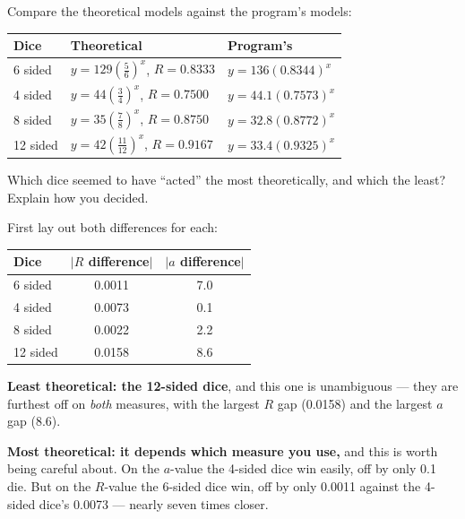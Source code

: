 \documentclass[12pt]{ximera}
\begin{document}
\begin{problem}
Compare the theoretical models against the program's models:

\begin{center}
\begin{tabular}{lll}
\hline
Dice & Theoretical & Program's \\
\hline
6 sided  & $y = 129\left(\tfrac{5}{6}\right)^x$, \; $R = 0.8333$   & $y = 136(0.8344)^x$ \\
4 sided  & $y = 44\left(\tfrac{3}{4}\right)^x$, \; $R = 0.7500$    & $y = 44.1(0.7573)^x$ \\
8 sided  & $y = 35\left(\tfrac{7}{8}\right)^x$, \; $R = 0.8750$    & $y = 32.8(0.8772)^x$ \\
12 sided & $y = 42\left(\tfrac{11}{12}\right)^x$, \; $R = 0.9167$  & $y = 33.4(0.9325)^x$ \\
\hline
\end{tabular}
\end{center}

Which dice seemed to have ``acted'' the most theoretically, and which the least? Explain
how you decided.

\begin{freeResponse}
\end{freeResponse}

\begin{solution}
First lay out both differences for each:

\begin{center}
\begin{tabular}{lcc}
\hline
Dice & $|R$ difference$|$ & $|a$ difference$|$ \\
\hline
6 sided  & 0.0011 & 7.0 \\
4 sided  & 0.0073 & 0.1 \\
8 sided  & 0.0022 & 2.2 \\
12 sided & 0.0158 & 8.6 \\
\hline
\end{tabular}
\end{center}

\textbf{Least theoretical: the 12-sided dice}, and this one is unambiguous --- they are
furthest off on \emph{both} measures, with the largest $R$ gap (0.0158) and the largest
$a$ gap (8.6).

\textbf{Most theoretical: it depends which measure you use,} and this is worth being
careful about. On the $a$-value the 4-sided dice win easily, off by only 0.1 die. But on
the $R$-value the 6-sided dice win, off by only 0.0011 against the 4-sided dice's 0.0073
--- nearly seven times closer.


\end{solution}
\end{problem}
\end{document}
